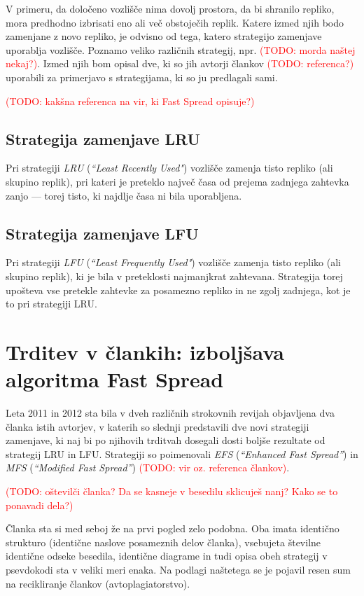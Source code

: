 \documentclass[a4paper, 12pt]{book}
\newcommand{\newterm}{\textit}
\newcommand{\TODO}[1]{\textcolor{red}{(TODO: #1)}}
\begin{document}
V primeru, da določeno vozlišče nima dovolj prostora, da bi shranilo repliko,
mora predhodno izbrisati eno ali več obstoječih replik. Katere izmed njih bodo
zamenjane z novo repliko, je odvisno od tega, katero strategijo zamenjave
uporablja vozlišče. Poznamo veliko različnih strategij, npr.
\TODO{morda naštej nekaj?}. Izmed njih bom opisal dve, ki so jih avtorji
člankov \TODO{referenca?} uporabili za primerjavo s strategijama, ki so ju
predlagali sami.

\TODO{kakšna referenca na vir, ki Fast Spread opisuje?}

\subsection{Strategija zamenjave LRU}

Pri strategiji \newterm{LRU} (\newterm{``Least Recently Used"}) vozlišče
zamenja tisto repliko (ali skupino replik), pri kateri je preteklo največ
časa od prejema zadnjega zahtevka zanjo --- torej tisto, ki najdlje časa
ni bila uporabljena.

\subsection{Strategija zamenjave LFU}

Pri strategiji \newterm{LFU} (\newterm{``Least Frequently Used"}) vozlišče
zamenja tisto repliko (ali skupino replik), ki je bila v preteklosti
najmanjkrat zahtevana. Strategija torej upošteva vse pretekle zahtevke za
posamezno repliko in ne zgolj zadnjega, kot je to pri strategiji LRU.

\section{Trditev v člankih: izboljšava algoritma Fast Spread}

Leta 2011 in 2012 sta bila v dveh različnih strokovnih revijah objavljena
dva članka istih avtorjev, v katerih so slednji predstavili dve novi
strategiji zamenjave, ki naj bi po njihovih trditvah dosegali dosti boljše
rezultate od strategij LRU in LFU. Strategiji
so poimenovali \newterm{EFS} (\newterm{``Enhanced Fast Spread''}) in
\newterm{MFS} (\newterm{``Modified Fast Spread''})
\TODO{vir oz. referenca člankov}.

\TODO{oštevilči članka? Da se kasneje v besedilu sklicuješ nanj? Kako se
to ponavadi dela?}

Članka sta si med seboj že na prvi pogled zelo podobna. Oba imata identično
strukturo (identične naslove posameznih delov članka), vsebujeta številne
identične odseke besedila, identične diagrame in tudi opisa obeh strategij
v psevdokodi sta v veliki meri enaka. Na podlagi naštetega se je pojavil
resen sum na recikliranje člankov (avtoplagiatorstvo).
\end{document}
